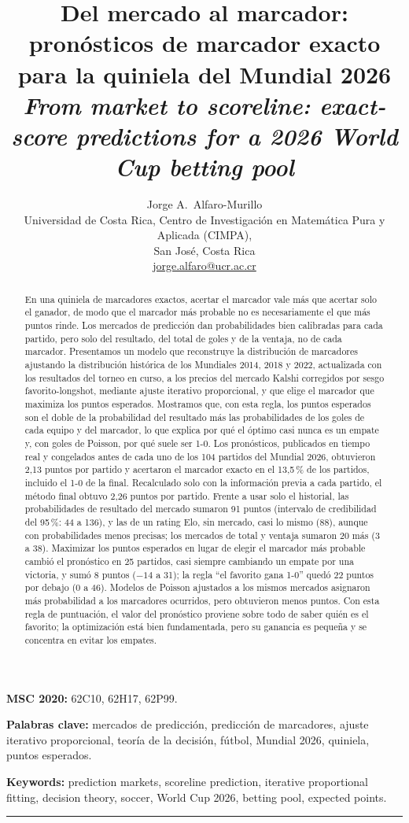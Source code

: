 \documentclass[12pt]{article}
\title{%
  \textbf{Del mercado al marcador: pronósticos de marcador exacto
  para la quiniela del Mundial 2026}\\[6pt]
  \large\textit{From market to scoreline: exact-score predictions
  for a 2026 World Cup betting pool}
}
\author{%
  Jorge A.\ Alfaro-Murillo\\
  \small Universidad de Costa Rica, Centro de Investigación en
  Matemática Pura y Aplicada (CIMPA),\\
  \small San José, Costa Rica\\
  \small \href{mailto:jorge.alfaro@ucr.ac.cr}{jorge.alfaro@ucr.ac.cr}
}
\date{}
\theoremstyle{plain}
\theoremstyle{remark}
\begin{document}
\maketitle

\noindent\textbf{MSC 2020:} 62C10, 62H17, 62P99.

\noindent\textbf{Palabras clave:} mercados de predicción,
predicción de marcadores, ajuste iterativo proporcional, teoría de la
decisión, fútbol, Mundial 2026, quiniela, puntos esperados.

\noindent\textbf{Keywords:} prediction markets, scoreline prediction,
iterative proportional fitting, decision theory, soccer, World Cup
2026, betting pool, expected points.

\bigskip\hrule\bigskip

\begin{abstract}
En una quiniela de marcadores exactos, acertar el marcador vale más
que acertar solo el ganador, de modo que el marcador más probable no
es necesariamente el que más puntos rinde.
Los mercados de predicción dan probabilidades bien calibradas para
cada partido, pero solo del resultado, del total de goles y de la
ventaja, no de cada marcador.
Presentamos un modelo que reconstruye la distribución de marcadores
ajustando la distribución histórica de los Mundiales 2014, 2018 y
2022, actualizada con los resultados del torneo en curso, a los
precios del mercado Kalshi corregidos por sesgo favorito-longshot,
mediante ajuste iterativo proporcional, y que elige el marcador que
maximiza los puntos esperados.
Mostramos que, con esta regla, los puntos esperados son el doble de la
probabilidad del resultado más las probabilidades de los goles de cada
equipo y del marcador, lo que explica por qué el óptimo casi nunca es
un empate y, con goles de Poisson, por qué suele ser 1-0.
Los pronósticos, publicados en tiempo real y congelados antes de cada
uno de los 104 partidos del Mundial 2026, obtuvieron 2,13
puntos por partido y acertaron el marcador exacto en el 13,5\,\% de
los partidos, incluido el 1-0 de la final.
Recalculado solo con la información previa a cada partido, el método
final obtuvo 2,26 puntos por partido.
Frente a usar solo el historial, las probabilidades de resultado del
mercado sumaron 91 puntos (intervalo de credibilidad del 95\,\%: 44
a 136), y las de un rating Elo, sin mercado, casi lo mismo (88),
aunque con probabilidades menos precisas; los mercados de total y
ventaja sumaron 20 más (3 a 38).
Maximizar los puntos esperados en lugar de elegir el marcador más
probable cambió el pronóstico en 25 partidos, casi siempre cambiando
un empate por una victoria, y sumó 8 puntos ($-14$ a 31); la regla
``el favorito gana 1-0'' quedó 22 puntos por debajo (0 a 46).
Modelos de Poisson ajustados a los mismos mercados asignaron más
probabilidad a los marcadores ocurridos, pero obtuvieron menos
puntos.
Con esta regla de puntuación, el valor del pronóstico proviene sobre
todo de saber quién es el favorito; la optimización está bien
fundamentada, pero su ganancia es pequeña y se concentra en evitar los
empates.
\end{abstract}
\end{document}
